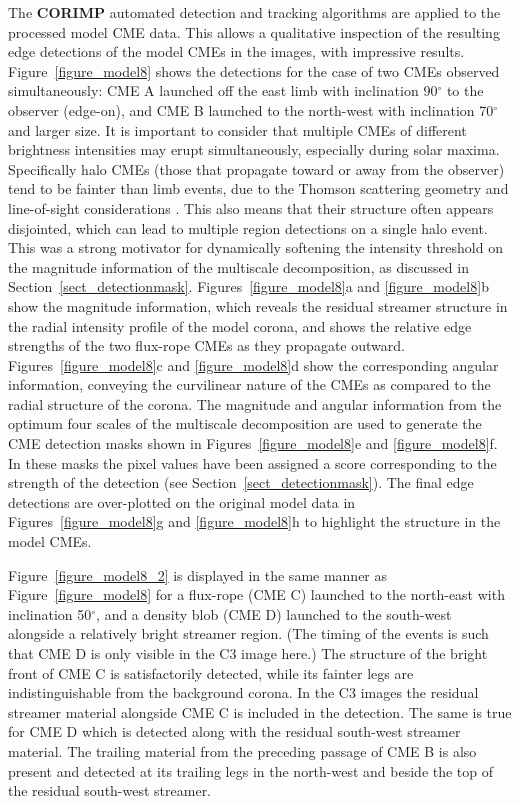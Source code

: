 \documentclass[preprint2]{aastex}
\begin{document}
The {\bf CORIMP} automated detection and tracking algorithms are applied to the processed model CME data. This allows a qualitative inspection of the resulting edge detections of the model CMEs in the images, with impressive results. Figure~\ref{figure_model8} shows the detections for the case of two CMEs observed simultaneously: CME A launched off the east limb with inclination 90$^{\circ}$ to the observer (edge-on), and CME B launched to the north-west with inclination 70$^{\circ}$ and larger size. It is important to consider that multiple CMEs of different brightness intensities may erupt simultaneously, especially during solar maxima. Specifically halo CMEs (those that propagate toward or away from the observer) tend to be fainter than limb events, due to the Thomson scattering geometry and line-of-sight considerations \citep{2006ApJ...642.1216V}. This also means that their structure often appears disjointed, which can lead to multiple region detections on a single halo event. This was a strong motivator for dynamically softening the intensity threshold on the magnitude information of the multiscale decomposition, as discussed in Section~\ref{sect_detectionmask}. Figures~\ref{figure_model8}a and \ref{figure_model8}b show the magnitude information, which reveals the residual streamer structure in the radial intensity profile of the model corona, and shows the relative edge strengths of the two flux-rope CMEs as they propagate outward. Figures~\ref{figure_model8}c and \ref{figure_model8}d show the corresponding angular information, conveying the curvilinear nature of the CMEs as compared to the radial structure of the corona. The magnitude and angular information from the optimum four scales of the multiscale decomposition are used to generate the CME detection masks shown in Figures~\ref{figure_model8}e and \ref{figure_model8}f. In these masks the pixel values have been assigned a score corresponding to the strength of the detection (see Section~\ref{sect_detectionmask}). The final edge detections are over-plotted on the original model data in Figures~\ref{figure_model8}g and \ref{figure_model8}h to highlight the structure in the model CMEs.

Figure~\ref{figure_model8_2} is displayed in the same manner as Figure~\ref{figure_model8} for a flux-rope (CME C) launched to the north-east with inclination 50$^{\circ}$, and a density blob (CME D) launched to the south-west alongside a relatively bright streamer region. (The timing of the events is such that CME D is only visible in the C3 image here.) The structure of the bright front of CME C is satisfactorily detected, while its fainter legs are indistinguishable from the background corona. In the C3 images the residual streamer material alongside CME C is included in the detection. The same is true for CME D which is detected along with the residual south-west streamer material. The trailing material from the preceding passage of CME B is also present and detected at its trailing legs in the north-west and beside the top of the residual south-west streamer.
\end{document}
